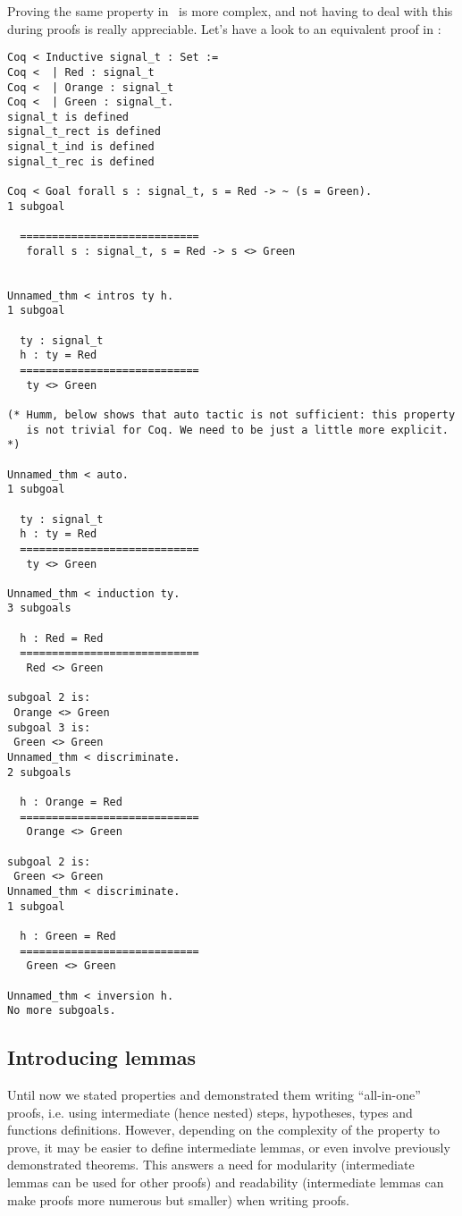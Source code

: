 \documentclass[11pt,a4paper,twoside,onecolumn,fullpage]{article}
\begin{document}
{\scriptsize
}

Proving the same property in \coq\ is more complex, and not having to
deal with this during proofs is really appreciable. Let's have a look
to an equivalent proof in \coq:

{\scriptsize
\begin{lstlisting}[language=MyCoq]
Coq < Inductive signal_t : Set :=
Coq <  | Red : signal_t
Coq <  | Orange : signal_t
Coq <  | Green : signal_t.
signal_t is defined
signal_t_rect is defined
signal_t_ind is defined
signal_t_rec is defined

Coq < Goal forall s : signal_t, s = Red -> ~ (s = Green).
1 subgoal
  
  ============================
   forall s : signal_t, s = Red -> s <> Green


Unnamed_thm < intros ty h.
1 subgoal
  
  ty : signal_t
  h : ty = Red
  ============================
   ty <> Green

(* Humm, below shows that auto tactic is not sufficient: this property
   is not trivial for Coq. We need to be just a little more explicit. *)

Unnamed_thm < auto.
1 subgoal
  
  ty : signal_t
  h : ty = Red
  ============================
   ty <> Green

Unnamed_thm < induction ty.
3 subgoals
  
  h : Red = Red
  ============================
   Red <> Green

subgoal 2 is:
 Orange <> Green
subgoal 3 is:
 Green <> Green
Unnamed_thm < discriminate.
2 subgoals
  
  h : Orange = Red
  ============================
   Orange <> Green

subgoal 2 is:
 Green <> Green
Unnamed_thm < discriminate.
1 subgoal
  
  h : Green = Red
  ============================
   Green <> Green

Unnamed_thm < inversion h.
No more subgoals.
\end{lstlisting}}

\subsection{Introducing lemmas}
Until now we stated properties and demonstrated them writing
``all-in-one'' proofs, i.e. using intermediate (hence nested) steps,
hypotheses, types and functions definitions. However, depending on the
complexity of the property to prove, it may be easier to define
intermediate lemmas, or even involve previously demonstrated
theorems. This answers a need for modularity (intermediate lemmas can
be used for other proofs) and readability (intermediate lemmas can
make proofs more numerous but smaller) when writing proofs.
\end{document}

